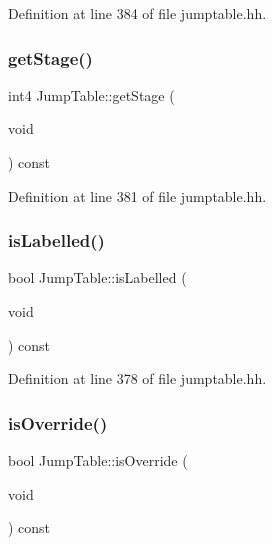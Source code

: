Definition at line 384 of file jumptable.\+hh.

\mbox{\label{class_jump_table_a52203c6582b2b49390ba3815e1377c5a}} 
\subsubsection{\texorpdfstring{getStage()}{getStage()}}
{\footnotesize\ttfamily int4 Jump\+Table\+::get\+Stage (\begin{DoxyParamCaption}\item[{void}]{ }\end{DoxyParamCaption}) const\hspace{0.3cm}{\ttfamily [inline]}}



Definition at line 381 of file jumptable.\+hh.

\mbox{\label{class_jump_table_a23d6ce09d425674cbdc41cfb082b1937}} 
\subsubsection{\texorpdfstring{isLabelled()}{isLabelled()}}
{\footnotesize\ttfamily bool Jump\+Table\+::is\+Labelled (\begin{DoxyParamCaption}\item[{void}]{ }\end{DoxyParamCaption}) const\hspace{0.3cm}{\ttfamily [inline]}}



Definition at line 378 of file jumptable.\+hh.

\mbox{\label{class_jump_table_af02131615a17c9fa6ee4693c3988eb5a}} 
\subsubsection{\texorpdfstring{isOverride()}{isOverride()}}
{\footnotesize\ttfamily bool Jump\+Table\+::is\+Override (\begin{DoxyParamCaption}\item[{void}]{ }\end{DoxyParamCaption}) const}



